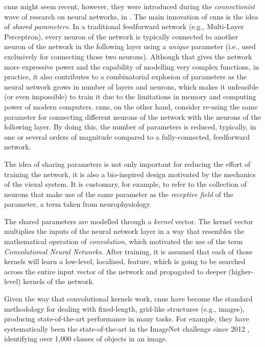 

\glspl{cnn} might seem recent, however, they were introduced
during the \emph{connectionist} wave of research on neural
networks, in \textcite{lecun1989generalization,
lecun1989handwritten}. The main innovation of \glspl{cnn} is
the idea of \emph{shared parameters}. In a traditional
feedforward network (e.g., Multi-Layer Perceptron), every
neuron of the network is typically connected to another
neuron of the network in the following layer using a
\emph{unique} parameter (i.e., used exclusively for
connecting those two neurons). Although that gives the
network more expressive power and the capability of
modelling very complex functions, in practice, it also
contributes to a combinatorial explosion of parameters as
the neural network grows in number of layers and neurons,
which makes it unfeasible (or even impossible) to train it
due to the limitations in memory and computing power of
modern computers. \glspl{cnn}, on the other hand, consider
re-using the same parameter for connecting different neurons
of the network with the neurons of the following layer. By
doing this, the number of parameters is reduced, typically,
in one or several orders of magnitude compared to a
fully-connected, feedforward network.

The idea of sharing parameters is not only important for
reducing the effort of training the network, it is also a
bio-inspired design motivated by the mechanics of the visual
system. It is customary, for example, to refer to the
collection of neurons that make use of the same parameter as
the \emph{receptive field} of the parameter, a term taken
from neurophysiology.

The shared parameters are modelled through a \emph{kernel}
vector. The kernel vector multiplies the inputs of the
neural network layer in a way that resembles the
mathematical operation of \emph{convolution}, which
motivated the use of the term \emph{Convolutional Neural
Networks}. After training, it is assumed that each of those
kernels will learn a low-level, localized, feature, which is
going to be searched across the entire input vector of the
network and propagated to deeper (higher-level) kernels of
the network.

Given the way that convolutional kernels work, \glspl{cnn}
have become the standard methodology for dealing with
fixed-length, grid-like structures (e.g., images), producing
state-of-the-art performance in many tasks. For example,
they have systematically been the state-of-the-art in the
ImageNet challenge since 2012
\parencite{krizhevsky2012imagenet}, identifying over 1,000
classes of objects in an image.

